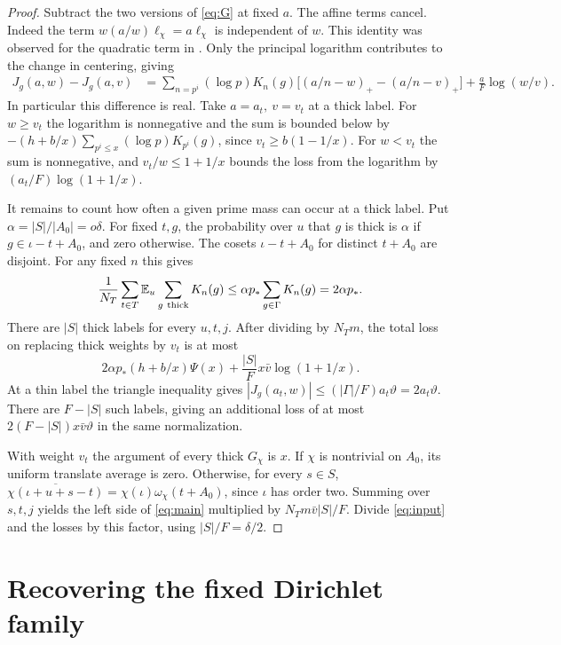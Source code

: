 \documentclass[11pt,letterpaper]{article}
\newcommand{\E}{\mathbb E}
\numberwithin{equation}{section}
\begin{document}
\begin{proof}
Subtract the two versions of \eqref{eq:G} at fixed \(a\). The affine terms cancel. Indeed the term \(w(a/w)\ell_\chi=a\ell_\chi\) is independent of \(w\). This identity was observed for the quadratic term in \cite{bramble}. Only the principal logarithm contributes to the change in centering, giving
\begin{align}
 J_g(a,w)-J_g(a,v)
 &=\sum_{n=p^i}(\log p)K_n(g)
       \big[(a/n-w)_+-(a/n-v)_+\big]+\frac aF\log(w/v).             \label{eq:diff}
\end{align}
In particular this difference is real. Take \(a=a_t,\ v=v_t\) at a thick label. For \(w\ge v_t\) the logarithm is nonnegative and the sum is bounded below by
\(- (h+b/x)\sum_{p^i\le x}(\log p)K_{p^i}(g)\), since \(v_t\ge b(1-1/x)\). For \(w<v_t\) the sum is nonnegative, and \(v_t/w\le1+1/x\) bounds the loss from the logarithm by \((a_t/F)\log(1+1/x)\).

It remains to count how often a given prime mass can occur at a thick label. Put \(\alpha=|S|/|A_0|=o\delta\). For fixed \(t,g\), the probability over \(u\) that \(g\) is thick is \(\alpha\) if \(g\in\iota-t+A_0\), and zero otherwise. The cosets \(\iota-t+A_0\) for distinct \(t+A_0\) are disjoint. For any fixed \(n\) this gives
\[
 \frac1{N_T}\sum_{t\in T}\E_u\sum_{g\ {\rm thick}}K_n(g)
 \le \alpha p_* \sum_{g\in\Gamma}K_n(g)=2\alpha p_* .
\]
There are \(|S|\) thick labels for every \(u,t,j\). After dividing by \(N_Tm\), the total loss on replacing thick weights by \(v_t\) is at most
\[
  2\alpha p_*(h+b/x)\Psi(x)+\frac{|S|}{F} x\bar v\log(1+1/x).
\]
At a thin label the triangle inequality gives \(|J_g(a_t,w)|\le (|\Gamma|/F)a_t\vartheta=2a_t\vartheta\). There are \(F-|S|\) such labels, giving an additional loss of at most \(2(F-|S|)x\bar v\vartheta\) in the same normalization.

With weight \(v_t\) the argument of every thick \(G_\chi\) is \(x\). If \(\chi\) is nontrivial on \(A_0\), its uniform translate average is zero. Otherwise, for every \(s\in S\),
\(\overline{\chi(\iota+u+s-t)}=\chi(\iota)\omega_\chi(t+A_0)\), since \(\iota\) has order two. Summing over \(s,t,j\) yields the left side of \eqref{eq:main} multiplied by \(N_Tm\bar v|S|/F\). Divide \eqref{eq:input} and the losses by this factor, using \(|S|/F=\delta/2\).
\end{proof}

\section{Recovering the fixed Dirichlet family}\label{sec:family}
\end{document}
